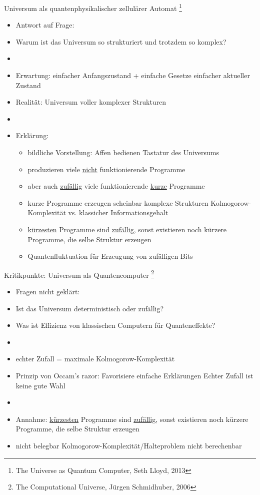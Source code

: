 \documentclass[aspectratio=1610, 9pt]{beamer}
\begin{document}
\begin{frame}{Universum als quantenphysikalischer zellulärer Automat \footnote[8]{The Universe as Quantum Computer, Seth Lloyd, 2013}}
  \begin{itemize}
    \item Antwort auf Frage:
    \item Warum ist das Universum so strukturiert und trotzdem so komplex?
    \item[]
    \item Erwartung: einfacher Anfangszustand + einfache Gesetze \rightarrow einfacher aktueller Zustand
    \item Realität: Universum voller komplexer Strukturen
    \item[]
    \item Erklärung:
    \begin{itemize}
      \item bildliche Vorstellung: Affen bedienen Tastatur des Universums
      \item produzieren viele \underline{nicht} funktionierende Programme
      \item aber auch \underline{zufällig} viele funktionierende \underline{kurze} Programme
      \item kurze Programme erzeugen scheinbar komplexe Strukturen \rightarrow Kolmogorow-Komplexität vs. klassicher Informationsgehalt
      \item \underline{kürzesten} Programme sind \underline{zufällig}, sonst existieren noch kürzere Programme, die selbe Struktur erzeugen
      \item[\rightarrow] Quantenfluktuation für Erzeugung von zufälligen Bits
    \end{itemize}
  \end{itemize}

\end{frame}

\begin{frame}{Kritikpunkte: Universum als Quantencomputer \footnote[16]{The Computational Universe, Jürgen Schmidhuber, 2006}}
  \begin{itemize}
    \item Fragen nicht geklärt:
    \item[] Ist das Universum deterministisch oder zufällig?
    \item[] Was ist Effizienz von klassischen Computern für Quanteneffekte?
    \item[]
    \item echter Zufall = maximale Kolmogorow-Komplexität
    \item Prinzip von Occam's razor: Favorisiere einfache Erklärungen \rightarrow Echter Zufall ist keine gute Wahl
    \item[]
    \item Annahme: \underline{kürzesten} Programme sind \underline{zufällig}, sonst existieren noch kürzere Programme, die selbe Struktur erzeugen
    \item nicht belegbar \rightarrow Kolmogorow-Komplexität/Halteproblem nicht berechenbar
  \end{itemize}

\end{frame}
\end{document}
